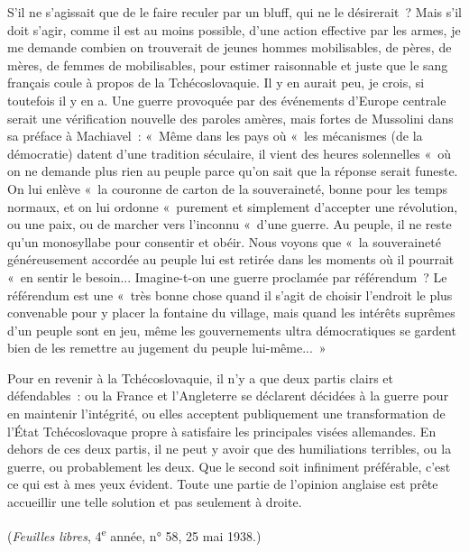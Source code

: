 \documentclass[french,twoside]{book} %
\begin{document}
S'il ne s'agissait que de le faire reculer par un bluff, qui ne le désirerait ? Mais s'il doit s'agir, comme il est au moins possible, d'une action effective par les armes, je me demande combien on trouverait de jeunes hommes mobilisa­bles, de pères, de mères, de femmes de mobilisables, pour estimer raisonnable et juste que le sang français coule à propos de la Tchécoslovaquie. Il y en aurait peu, je crois, si toutefois il y en a. Une guerre provoquée par des événements d'Europe centrale serait une vérification nouvelle des paroles amères, mais fortes de Mussolini dans sa préface à Machiavel : « Même dans les pays où « les mécanismes (de la démocratie) datent d'une tradition séculaire, il vient des heures solennelles « où on ne demande plus rien au peuple parce qu'on sait que la réponse serait funeste. On lui enlève « la couronne de carton de la souveraineté, bonne pour les temps normaux, et on lui ordonne « purement et simplement d'accepter une révolution, ou une paix, ou de marcher vers l'inconnu « d'une guerre. Au peuple, il ne reste qu'un monosyllabe pour consentir et obéir. Nous voyons que « la souveraineté généreusement accordée au peuple lui est retirée dans les moments où il pourrait « en sentir le besoin... Imagine-t-on une guerre proclamée par réfé­rendum ? Le référendum est une « très bonne chose quand il s'agit de choisir l'endroit le plus convenable pour y placer la fontaine du village, mais quand les intérêts suprêmes d'un peuple sont en jeu, même les gouvernements ultra démocratiques se gardent bien de les remettre au jugement du peuple lui-même... »\par
Pour en revenir à la Tchécoslovaquie, il n'y a que deux partis clairs et défendables : ou la France et l'Angleterre se déclarent décidées à la guerre pour en maintenir l'intégrité, ou elles acceptent publiquement une transforma­tion de l'État Tchécoslovaque propre à satisfaire les principales visées allemandes. En dehors de ces deux partis, il ne peut y avoir que des humilia­tions terribles, ou la guerre, ou probablement les deux. Que le second soit infiniment préférable, c'est ce qui est à mes yeux évident. Toute une partie de l'opinion anglaise est prête accueillir une telle solution et pas seulement à droite.\par
({\itshape Feuilles libres}, 4\textsuperscript{e} année, n° 58, 25 mai 1938.)\par

\begin{center}
\end{center}
\end{document}
